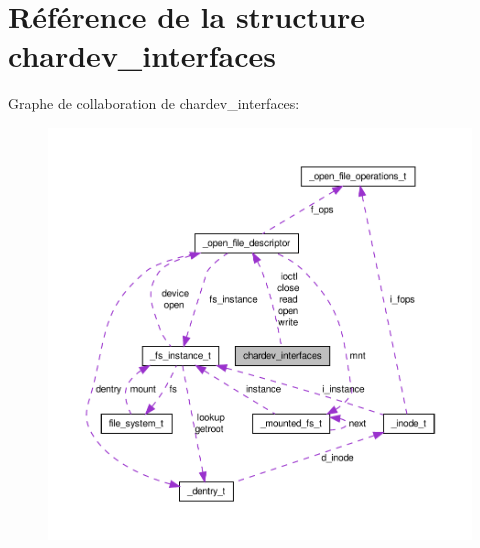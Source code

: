 \hypertarget{structchardev__interfaces}{\section{\-Référence de la structure chardev\-\_\-interfaces}
\label{structchardev__interfaces}
}


\-Graphe de collaboration de chardev\-\_\-interfaces\-:\nopagebreak
\begin{figure}[H]
\begin{center}
\leavevmode
\includegraphics[width=350pt]{structchardev__interfaces__coll__graph}
\end{center}
\end{figure}
